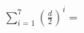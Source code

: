 \documentclass[preview]{standalone}
\begin{document}
\begin{align*}
\sum_{i=1}^7 \left(\frac{d}{2}\right)^i=
\end{align*}
\end{document}
